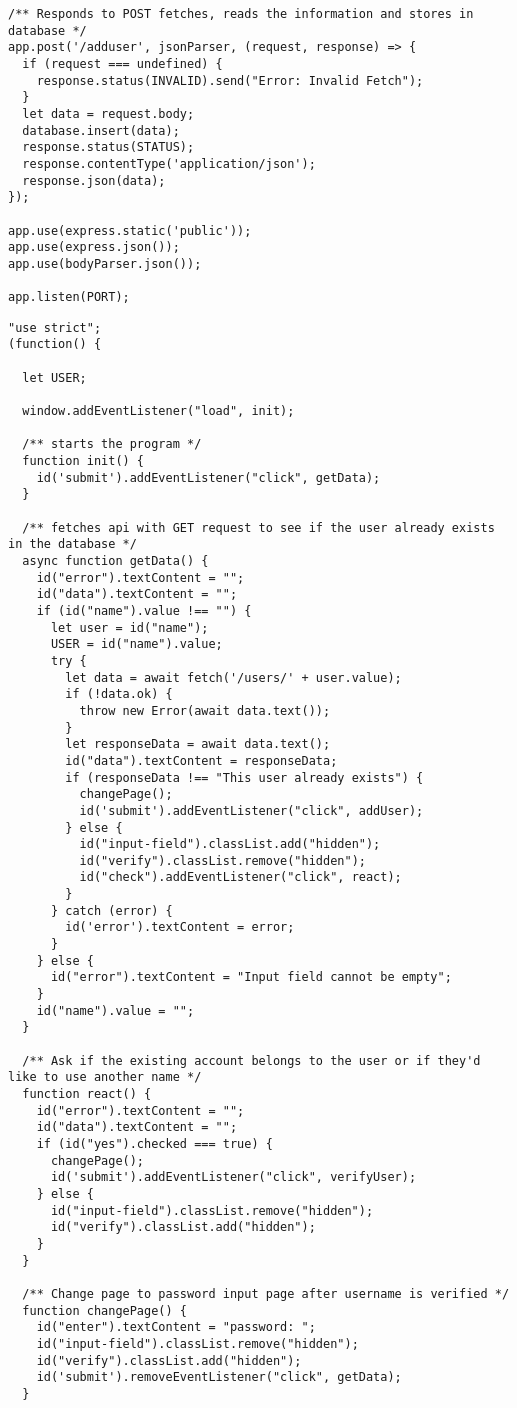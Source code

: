\documentclass[12pt, border = 4pt, multi]{article} %
\begin{document}
\begin{multicols}{2}
\begin{lstlisting}
/** Responds to POST fetches, reads the information and stores in database */
app.post('/adduser', jsonParser, (request, response) => {
  if (request === undefined) {
    response.status(INVALID).send("Error: Invalid Fetch");
  }
  let data = request.body;
  database.insert(data);
  response.status(STATUS);
  response.contentType('application/json');
  response.json(data);
});

app.use(express.static('public'));
app.use(express.json());
app.use(bodyParser.json());

app.listen(PORT);
\end{lstlisting}
\begin{lstlisting}
"use strict";
(function() {

  let USER;

  window.addEventListener("load", init);

  /** starts the program */
  function init() {
    id('submit').addEventListener("click", getData);
  }

  /** fetches api with GET request to see if the user already exists in the database */
  async function getData() {
    id("error").textContent = "";
    id("data").textContent = "";
    if (id("name").value !== "") {
      let user = id("name");
      USER = id("name").value;
      try {
        let data = await fetch('/users/' + user.value);
        if (!data.ok) {
          throw new Error(await data.text());
        }
        let responseData = await data.text();
        id("data").textContent = responseData;
        if (responseData !== "This user already exists") {
          changePage();
          id('submit').addEventListener("click", addUser);
        } else {
          id("input-field").classList.add("hidden");
          id("verify").classList.remove("hidden");
          id("check").addEventListener("click", react);
        }
      } catch (error) {
        id('error').textContent = error;
      }
    } else {
      id("error").textContent = "Input field cannot be empty";
    }
    id("name").value = "";
  }

  /** Ask if the existing account belongs to the user or if they'd like to use another name */
  function react() {
    id("error").textContent = "";
    id("data").textContent = "";
    if (id("yes").checked === true) {
      changePage();
      id('submit').addEventListener("click", verifyUser);
    } else {
      id("input-field").classList.remove("hidden");
      id("verify").classList.add("hidden");
    }
  }

  /** Change page to password input page after username is verified */
  function changePage() {
    id("enter").textContent = "password: ";
    id("input-field").classList.remove("hidden");
    id("verify").classList.add("hidden");
    id('submit').removeEventListener("click", getData);
  }


\end{lstlisting}
\end{multicols}
\end{document}

